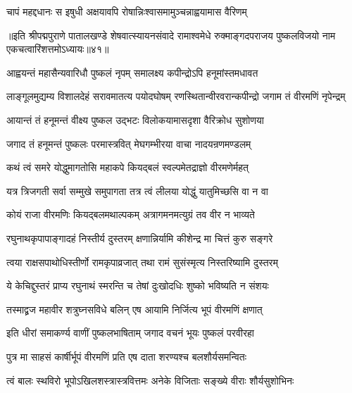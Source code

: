 \twolineshloka
{चापं महद्दधानः स इषुधी अक्षयावपि}
{रोषान्निःश्वासमामुञ्चन्नाह्वयामास वैरिणम्}%

॥इति श्रीपद्मपुराणे पातालखण्डे शेषवात्स्यायनसंवादे रामाश्वमेधे रुक्माङ्गदपराजय पुष्कलविजयो नाम एकचत्वारिंशत्तमोऽध्यायः॥४१॥



\twolineshloka
{आह्वयन्तं महासैन्यवारिधौ पुष्कलं नृपम्}
{समालक्ष्य कपीन्द्रोऽपि हनूमांस्तमधावत}%

\fourlineindentedshloka
{लाङ्गूलमुद्यम्य विशालदेहं}
{सरावमातत्य पयोदघोषम्}
{रणस्थितान्वीरवरान्कपीन्द्रो}
{जगाम तं वीरमणिं नृपेन्द्रम्}%

\twolineshloka
{आयान्तं तं हनूमन्तं वीक्ष्य पुष्कल उद्भटः}
{विलोकयामासदृशा वैरिक्रोध सुशोणया}%

\twolineshloka
{जगाद तं हनूमन्तं पुष्कलः परमास्त्रवित्}
{मेघगम्भीरया वाचा नादयन्रणमण्डलम्}%


\twolineshloka
{कथं त्वं समरे योद्धुमागतोसि महाकपे}
{कियद्बलं स्वल्पमेतद्राज्ञो वीरमणेर्महत्}%

\twolineshloka
{यत्र त्रिजगती सर्वा सम्मुखे समुपागता}
{तत्र त्वं लीलया योद्धुं यातुमिच्छसि वा न वा}%

\twolineshloka
{कोयं राजा वीरमणिः कियद्बलमथाल्पकम्}
{अत्रागमनमत्युग्रं तव वीर न भाव्यते}%

\twolineshloka
{रघुनाथकृपापाङ्गादहं निस्तीर्य दुस्तरम्}
{क्षणान्निर्यामि कीशेन्द्र मा चित्तं कुरु सङ्गरे}%

\twolineshloka
{त्वया राक्षसपाथोधिस्तीर्णो रामकृपाव्रजात्}
{तथा रामं सुसंस्मृत्य निस्तरिष्यामि दुस्तरम्}%

\twolineshloka
{ये केचिद्दुस्तरं प्राप्य रघुनाथं स्मरन्ति च}
{तेषां दुःखोदधिः शुष्को भविष्यति न संशयः}%

\twolineshloka
{तस्माद्व्रज महावीर शत्रुघ्नसविधे बलिन्}
{एष आयामि निर्जित्य भूपं वीरमणिं क्षणात्}%


\twolineshloka
{इति धीरां समाकर्ण्य वाणीं पुष्कलभाषिताम्}
{जगाद वचनं भूयः पुष्कलं परवीरहा}%


\twolineshloka
{पुत्र मा साहसं कार्षीर्भूपं वीरमणिं प्रति}
{एष दाता शरण्यश्च बलशौर्यसमन्वितः}%

\twolineshloka
{त्वं बालः स्थविरो भूपोऽखिलशस्त्रास्त्रवित्तमः}
{अनेके विजिताः सङ्ख्ये वीराः शौर्यसुशोभिनः}%

